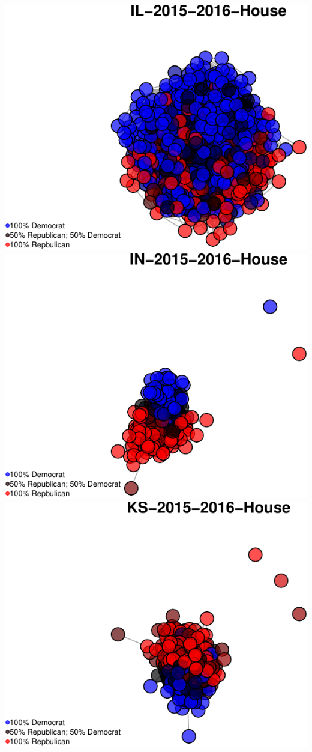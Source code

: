 \documentclass[]{article}
\begin{document}
\includegraphics{Final_Project_RMarkdown_Updated_files/figure-latex/unnamed-chunk-10-13.pdf}
\includegraphics{Final_Project_RMarkdown_Updated_files/figure-latex/unnamed-chunk-10-14.pdf}
\includegraphics{Final_Project_RMarkdown_Updated_files/figure-latex/unnamed-chunk-10-15.pdf}
\end{document}
